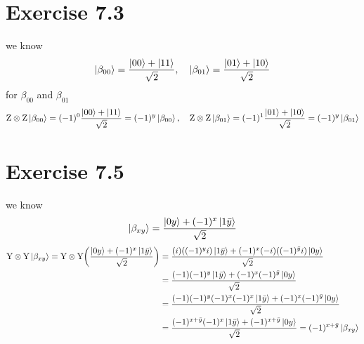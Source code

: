 \documentclass{article}
\newcommand{\tensor}[2]{#1 \otimes #2}
\begin{document}
\section*{Exercise 7.3}
we know
\begin{align*}
   \ket{\beta_{00}} = \frac{\ket{00}+\ket{11}}{\sqrt{2}}, \quad  \ket{\beta_{01}} = \frac{\ket{01}+\ket{10}}{\sqrt{2}}
\end{align*}
for $\beta_{00}$ and $\beta_{01}$ 
\begin{align*}
    \tensor{\text{Z}}{\text{Z}}\ket{\beta_{00}} = (-1)^0\frac{\ket{00}+\ket{11}}{\sqrt{2}} = (-1)^{y}\ket{\beta_{00}}, \quad \tensor{\text{Z}}{\text{Z}}\ket{\beta_{01}} = (-1)^1\frac{\ket{01}+\ket{10}}{\sqrt{2}} = (-1)^{y}\ket{\beta_{01}}
\end{align*}
\section*{Exercise 7.5}
we know
\begin{align*}
    \ket{\beta_{xy}} = \frac{\ket{0y}+(-1)^{x}\ket{1\bar{y}}}{\sqrt{2}}
\end{align*}
\begin{align*}
    \tensor{\text{Y}}{\text{Y}}\ket{\beta_{xy}} =  \tensor{\text{Y}}{\text{Y}}\bigg(\frac{\ket{0y}+(-1)^{x}\ket{1\bar{y}}}{\sqrt{2}}\bigg) &= \frac{(i)((-1)^{y}i)\ket{1\bar{y}}+(-1)^{x}(-i)((-1)^{\bar{y}}i)\ket{0y}}{\sqrt{2}} \\
    &= \frac{(-1)(-1)^{y}\ket{1\bar{y}}+(-1)^{x}(-1)^{\bar{y}}\ket{0y}}{\sqrt{2}} \\
    &= \frac{(-1)(-1)^{y}(-1)^{x}(-1)^{x}\ket{1\bar{y}}+(-1)^{x}(-1)^{\bar{y}}\ket{0y}}{\sqrt{2}} \\
    &= \frac{(-1)^{x+\bar{y}}(-1)^{x}\ket{1\bar{y}}+(-1)^{x+\bar{y}}\ket{0y}}{\sqrt{2}} = (-1)^{x+\bar{y}}\ket{\beta_{xy}}
\end{align*}
\end{document}
